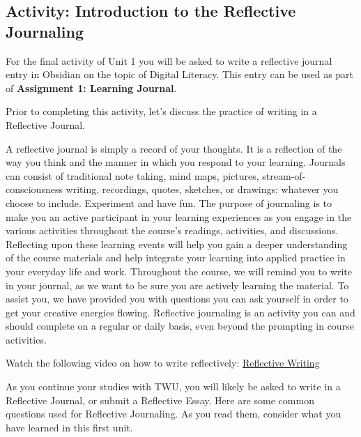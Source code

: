 \documentclass[
]{book}
\theoremstyle{definition}
\theoremstyle{definition}
\theoremstyle{definition}
\theoremstyle{definition}
\theoremstyle{remark}
\begin{document}
\hypertarget{activity-introduction-to-the-reflective-journaling}{%
\subsection*{Activity: Introduction to the Reflective Journaling}\label{activity-introduction-to-the-reflective-journaling}}

\begin{reflect}
For the final activity of Unit 1 you will be asked to write a reflective journal entry in Obsidian on the topic of Digital Literacy. This entry can be used as part of \textbf{Assignment 1: Learning Journal}.

Prior to completing this activity, let's discuss the practice of writing in a Reflective Journal.

A reflective journal is simply a record of your thoughts. It is a reflection of the way you think and the manner in which you respond to your learning. Journals can consist of traditional note taking, mind maps, pictures, stream-of-consciousness writing, recordings, quotes, sketches, or drawings: whatever you choose to include. Experiment and have fun. The purpose of journaling is to make you an active participant in your learning experiences as you engage in the various activities throughout the course's readings, activities, and discussions. Reflecting upon these learning events will help you gain a deeper understanding of the course materials and help integrate your learning into applied practice in your everyday life and work. Throughout the course, we will remind you to write in your journal, as we want to be sure you are actively learning the material. To assist you, we have provided you with questions you can ask yourself in order to get your creative energies flowing. Reflective journaling is an activity you can and should complete on a regular or daily basis, even beyond the prompting in course activities.

Watch the following video on how to write reflectively: \href{https://www.youtube.com/watch?v=QoI67VeE3ds}{Reflective Writing}

As you continue your studies with TWU, you will likely be asked to write in a Reflective Journal, or submit a Reflective Essay. Here are some common questions used for Reflective Journaling. As you read them, consider what you have learned in this first unit.


\end{reflect}
\end{document}
